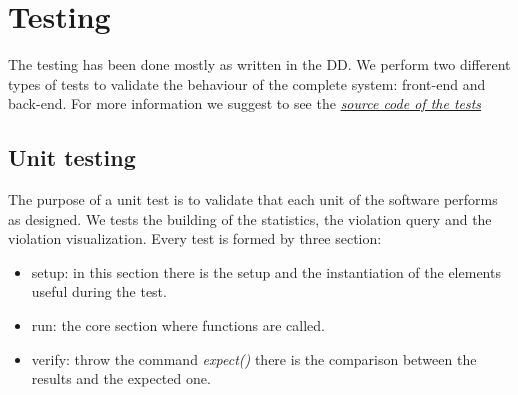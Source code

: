 \documentclass[../ITD.tex]{subfiles}
\begin{document}
    \chapter{Testing}\label{ch:testing}
    The testing has been done mostly as written in the DD. We perform two different types of tests to validate the behaviour of the complete system: front-end and back-end.
    \newline For more information we suggest to see the \href{https://github.com/fedy97/MorrealeMaddesInnocente/tree/master/safe_streets/test}{\emph{source code of the tests}}
    \section{Unit testing}\label{sec:unit-testing}
    The purpose of a unit test is to validate that each unit of the software performs as designed.
    We tests the building of the statistics, the violation query and the violation visualization.
    \newline Every test is formed by three section:
    \begin{itemize}
        \item setup: in this section there is the setup and the instantiation of the elements useful during the test.
        \item run: the core section where functions are called.
        \item verify: throw the command \textit{expect()} there is the comparison between the results and the expected one.
    \end{itemize}
\end{document}
